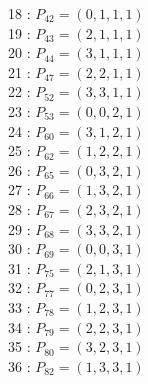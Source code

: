 \documentclass{article}
\begin{document}
{\begin{multicols}{3}
18 : $P_{42}=( 0, 1, 1, 1 )$\\
19 : $P_{43}=( 2, 1, 1, 1 )$\\
20 : $P_{44}=( 3, 1, 1, 1 )$\\
21 : $P_{47}=( 2, 2, 1, 1 )$\\
22 : $P_{52}=( 3, 3, 1, 1 )$\\
23 : $P_{53}=( 0, 0, 2, 1 )$\\
24 : $P_{60}=( 3, 1, 2, 1 )$\\
25 : $P_{62}=( 1, 2, 2, 1 )$\\
26 : $P_{65}=( 0, 3, 2, 1 )$\\
27 : $P_{66}=( 1, 3, 2, 1 )$\\
28 : $P_{67}=( 2, 3, 2, 1 )$\\
29 : $P_{68}=( 3, 3, 2, 1 )$\\
30 : $P_{69}=( 0, 0, 3, 1 )$\\
31 : $P_{75}=( 2, 1, 3, 1 )$\\
32 : $P_{77}=( 0, 2, 3, 1 )$\\
33 : $P_{78}=( 1, 2, 3, 1 )$\\
34 : $P_{79}=( 2, 2, 3, 1 )$\\
35 : $P_{80}=( 3, 2, 3, 1 )$\\
36 : $P_{82}=( 1, 3, 3, 1 )$\\
\end{multicols}


%


%


}%
\end{document}
